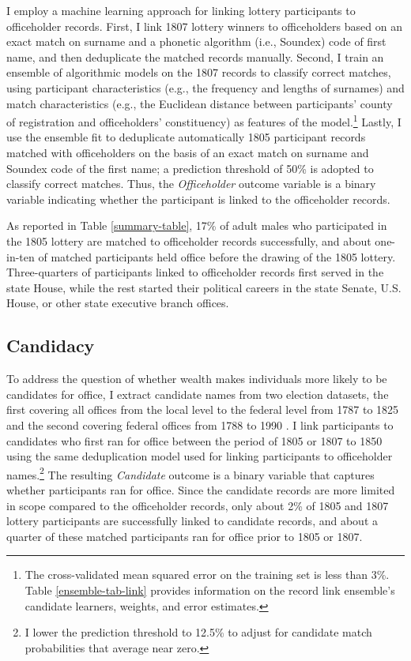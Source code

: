 I employ a machine learning approach for linking lottery participants to officeholder records. First, I link 1807 lottery winners to officeholders based on an exact match on surname and a phonetic algorithm (i.e., Soundex) code of first name, and then deduplicate the matched records manually. Second, I train an ensemble of algorithmic models on the 1807 records to classify correct matches, using participant characteristics (e.g., the frequency and lengths of surnames) and match characteristics (e.g., the Euclidean distance between participants' county of registration and officeholders' constituency) as features of the model.\footnote{The cross-validated mean squared error on the training set is less than 3\%. Table \ref{ensemble-tab-link} provides information on the record link ensemble's candidate learners, weights, and error estimates.} Lastly, I use the ensemble fit to deduplicate automatically 1805 participant records matched with officeholders on the basis of an exact match on surname and Soundex code of the first name; a prediction threshold of 50\% is adopted to classify correct matches. Thus, the \textit{Officeholder} outcome variable is a binary variable indicating whether the participant is linked to the officeholder records.

As reported in Table \ref{summary-table}, 17\% of adult males who participated in the 1805 lottery are matched to officeholder records successfully, and about one-in-ten of matched participants held office before the drawing of the 1805 lottery. Three-quarters of participants linked to officeholder records first served in the state House, while the rest started their political careers in the state Senate, U.S. House, or other state executive branch offices.

\subsection{Candidacy}

To address the question of whether wealth makes individuals more likely to be candidates for office, I extract candidate names from two election datasets, the first covering all offices from the local level to the federal level from 1787 to 1825 \citep{lampi2012} and the second covering federal offices from 1788 to 1990 \citep{inter1984}. I link participants to candidates who first ran for office between the period of 1805 or 1807 to 1850 using the same deduplication model used for linking participants to officeholder names.\footnote{I lower the prediction threshold to 12.5\% to adjust for candidate match probabilities that average near zero.} The resulting \textit{Candidate} outcome is a binary variable that captures whether participants ran for office. Since the candidate records are more limited in scope compared to the officeholder records, only about 2\% of 1805 and 1807 lottery participants are successfully linked to candidate records, and about a quarter of these matched participants ran for office prior to 1805 or 1807.

